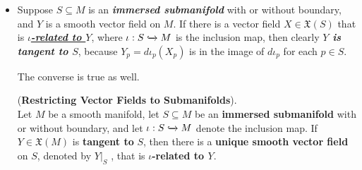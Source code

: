 \documentclass[11pt]{article}
\begin{document}
\begin{itemize}
\item \begin{remark}
Suppose $S\subseteq M$ is an \textbf{\emph{immersed submanifold}} with or without boundary, and $Y$ is a smooth vector field on $M$. If there is a vector field $X \in \mathfrak{X}(S)$ that is \underline{\emph{\textbf{$\iota$-related to $Y$}}}, where $\iota: S \xhookrightarrow{} M$ is the inclusion map, then clearly \emph{\textbf{$Y$ is tangent to $S$}}, because $Y_p = d\iota_{p}(X_p)$ is in the image of $d\iota_p$ for each $p \in S$. 

The converse is true as well.
\begin{proposition} (\textbf{Restricting Vector Fields to Submanifolds}). \citep{lee2003introduction}\\
Let $M$ be a  smooth manifold, let $S\subseteq M$ be an \textbf{immersed submanifold} with or without boundary, and let $\iota: S \xhookrightarrow{} M$ denote the inclusion map. If $Y \in \mathfrak{X}(M)$ is \textbf{tangent to} $S$, then there is a \textbf{unique smooth vector field} on $S$, denoted by $Y|_{S}$ , that is \textbf{$\iota$-related to $Y$}.
\end{proposition}
\end{remark}
\end{itemize}
\end{document}
